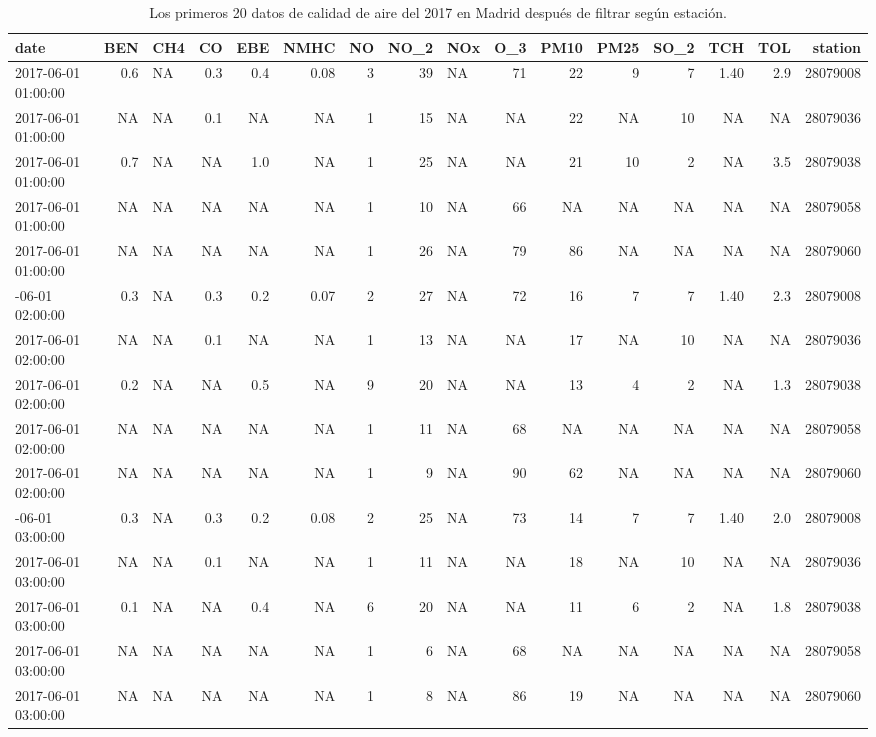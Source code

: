 \documentclass[]{book}
\begin{document}
\begin{table}

\caption{\label{tab:Madrid2017b}Los primeros 20 datos de calidad de aire del 2017 en Madrid después de filtrar según estación.}
\centering
\begin{tabular}[t]{lrlrrrrrlrrrrrrr}
\toprule
date & BEN & CH4 & CO & EBE & NMHC & NO & NO\_2 & NOx & O\_3 & PM10 & PM25 & SO\_2 & TCH & TOL & station\\
\midrule
2017-06-01 01:00:00 & 0.6 & NA & 0.3 & 0.4 & 0.08 & 3 & 39 & NA & 71 & 22 & 9 & 7 & 1.40 & 2.9 & 28079008\\
2017-06-01 01:00:00 & NA & NA & 0.1 & NA & NA & 1 & 15 & NA & NA & 22 & NA & 10 & NA & NA & 28079036\\
2017-06-01 01:00:00 & 0.7 & NA & NA & 1.0 & NA & 1 & 25 & NA & NA & 21 & 10 & 2 & NA & 3.5 & 28079038\\
2017-06-01 01:00:00 & NA & NA & NA & NA & NA & 1 & 10 & NA & 66 & NA & NA & NA & NA & NA & 28079058\\
2017-06-01 01:00:00 & NA & NA & NA & NA & NA & 1 & 26 & NA & 79 & 86 & NA & NA & NA & NA & 28079060\\
\addlinespace
2017-06-01 02:00:00 & 0.3 & NA & 0.3 & 0.2 & 0.07 & 2 & 27 & NA & 72 & 16 & 7 & 7 & 1.40 & 2.3 & 28079008\\
2017-06-01 02:00:00 & NA & NA & 0.1 & NA & NA & 1 & 13 & NA & NA & 17 & NA & 10 & NA & NA & 28079036\\
2017-06-01 02:00:00 & 0.2 & NA & NA & 0.5 & NA & 9 & 20 & NA & NA & 13 & 4 & 2 & NA & 1.3 & 28079038\\
2017-06-01 02:00:00 & NA & NA & NA & NA & NA & 1 & 11 & NA & 68 & NA & NA & NA & NA & NA & 28079058\\
2017-06-01 02:00:00 & NA & NA & NA & NA & NA & 1 & 9 & NA & 90 & 62 & NA & NA & NA & NA & 28079060\\
\addlinespace
2017-06-01 03:00:00 & 0.3 & NA & 0.3 & 0.2 & 0.08 & 2 & 25 & NA & 73 & 14 & 7 & 7 & 1.40 & 2.0 & 28079008\\
2017-06-01 03:00:00 & NA & NA & 0.1 & NA & NA & 1 & 11 & NA & NA & 18 & NA & 10 & NA & NA & 28079036\\
2017-06-01 03:00:00 & 0.1 & NA & NA & 0.4 & NA & 6 & 20 & NA & NA & 11 & 6 & 2 & NA & 1.8 & 28079038\\
2017-06-01 03:00:00 & NA & NA & NA & NA & NA & 1 & 6 & NA & 68 & NA & NA & NA & NA & NA & 28079058\\
2017-06-01 03:00:00 & NA & NA & NA & NA & NA & 1 & 8 & NA & 86 & 19 & NA & NA & NA & NA & 28079060\\

\end{tabular}
\end{table}
\end{document}
